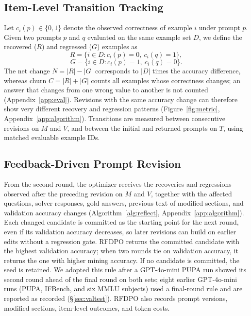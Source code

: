 \documentclass[11pt]{article}
\begin{document}
\subsection{Item-Level Transition Tracking}
\label{sec:metric}

Let $c_i(p)\in\{0,1\}$ denote the observed correctness of example $i$ under prompt $p$. Given two prompts $p$ and $q$ evaluated on the same example set $D$, we define the recovered ($R$) and regressed ($G$) examples as
\vspace{-8px}
\begin{equation}
R=\{i\in D:c_i(p)=0,\ c_i(q)=1\},
\end{equation}
\begin{equation}
G=\{i\in D:c_i(p)=1,\ c_i(q)=0\}.
\end{equation}
The net change $N=|R|-|G|$ corresponds to $|D|$ times the accuracy difference, whereas churn $C=|R|+|G|$ counts all examples whose correctness changes; an answer that changes from one wrong value to another is not counted (Appendix~\ref{app:eval}). Revisions with the same accuracy change can therefore show very different recovery and regression patterns (Figure~\ref{fig:metric}, Appendix~\ref{app:algorithm}). Transitions are measured between consecutive revisions on $M$ and $V$, and between the initial and returned prompts on $T$, using matched evaluable example IDs.

\subsection{Feedback-Driven Prompt Revision}
\label{sec:optimization}
\label{sec:selection}

From the second round, the optimizer receives the recoveries and regressions observed after the preceding revision on $M$ and $V$, together with the affected questions, solver responses, gold answers, previous text of modified sections, and validation accuracy changes (Algorithm~\ref{alg:reflect}, Appendix~\ref{app:algorithm}). Each changed candidate is committed as the starting point for the next round, even if its validation accuracy decreases, so later revisions can build on earlier edits without a regression gate. RFDPO returns the committed candidate with the highest validation accuracy; when two rounds tie on validation accuracy, it returns the one with higher mining accuracy. If no candidate is committed, the seed is retained. We adopted this rule after a GPT-4o-mini PUPA run showed its second round ahead of the final round on both sets; eight earlier GPT-4o-mini runs (PUPA, IFBench, and six MMLU subjects) used a final-round rule and are reported as recorded (\S\ref{sec:valtest}). RFDPO also records prompt versions, modified sections, item-level outcomes, and token costs.
\end{document}
